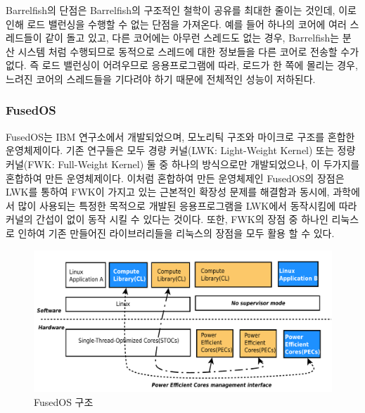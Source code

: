 Barrelfish의 단점은 Barrelfish의 구조적인 철학이 공유를 최대한 줄이는 것인데, 
이로 인해 로드 밸런싱을 수행할 수 없는 단점을 가져온다. 
예를 들어 하나의 코어에 여러 스레드들이 같이 돌고 있고, 다른 코어에는 아무런 
스레드도 없는 경우, Barrelfish는 분산 시스템 처럼 수행되므로 동적으로 스레드에 대한 정보들을 
다른 코어로 전송할 수가 없다.
즉 로드 밸런싱이 어려우므로 응용프로그램에 따라,
로드가 한 쪽에 몰리는 경우, 느려진 코어의 스레드들을 기다려야 하기 때문에 전체적인 
성능이 저하된다.  

\subsubsection{FusedOS}
FusedOS는 IBM 연구소에서 개발되었으며, 모노리틱 구조와 마이크로 구조를 혼합한 운영체제이다.
기존 연구들은 모두 경량 커널(LWK: Light-Weight Kernel) 또는 정량 커널(FWK:
Full-Weight Kernel) 둘 중 하나의 방식으로만 개발되었으나, 이 두가지를 
혼합하여 만든 운영체제이다.
이처럼 혼합하여 만든 운영체제인 FusedOS의 장점은 LWK를 통하여 FWK이 가지고 있는 근본적인 확장성 
문제를 해결함과 동시에, 과학에서 많이 사용되는 특정한 목적으로 개발된 응용프로그램을 
LWK에서 동작시킴에 따라 커널의 간섭이 없이 동작 시킬 수 있다는 것이다. 
또한, FWK의 장점 중 하나인 리눅스로 인하여 기존 만들어진 라이브러리들을 
리눅스의 장점을 모두 활용 할 수 있다.
 
\begin{figure}[h!]
    \centering
    \includegraphics[width=1\textwidth]{fig/fusedos/fusedos}
    \caption{FusedOS 구조}
  \label{fig:FusedOS}
\end{figure}

